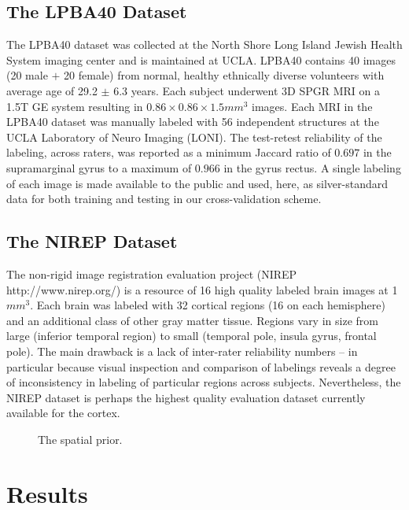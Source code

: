 \documentclass[preprint,authoryear,12pt]{elsarticle}
\begin{document}
\subsection{The LPBA40 Dataset}  
\label{sec:lpba}
The LPBA40 dataset \cite{Shattuck2008} was collected at the North Shore Long
Island Jewish Health System imaging center and is maintained at UCLA.
LPBA40 contains 40 images (20 male $+$ 20 female) from normal, healthy
ethnically diverse volunteers with average age of 29.2 $\pm$ 6.3
years.  Each subject underwent 3D SPGR MRI on a 1.5T GE system
resulting in $0.86 \times 0.86 \times 1.5 mm^3$ images.  Each MRI in
the LPBA40 dataset was manually labeled with 56 independent structures
at the UCLA Laboratory of Neuro Imaging (LONI).  The test-retest
reliability of the labeling, across raters, was reported as a minimum
Jaccard ratio of $0.697$ in the supramarginal gyrus to a maximum of
$0.966$ in the gyrus rectus.  A single labeling of each image is made
available to the public and used, here, as silver-standard data 
for both training and testing in our cross-validation scheme. 

\subsection{The NIREP Dataset}  
The non-rigid image registration evaluation project (NIREP
http://www.nirep.org/) is a resource of 16 high quality labeled brain
images at 1$mm^3$.  Each brain was labeled with 32 cortical regions
(16 on each hemisphere) and an additional class of other gray matter
tissue.  Regions vary in size from large (inferior temporal region) to
small (temporal pole, insula gyrus, frontal pole).  The main drawback
is a lack of inter-rater reliability numbers -- in particular because
visual inspection and comparison of labelings reveals a degree of
inconsistency in labeling of particular regions across subjects.
Nevertheless, the NIREP dataset is perhaps the highest quality
evaluation dataset currently available for the cortex. 

\begin{figure}
\caption{The spatial prior.
\label{fig:spatp} }
\vspace{-0.1in}
\end{figure}


\section{Results}
\end{document}
